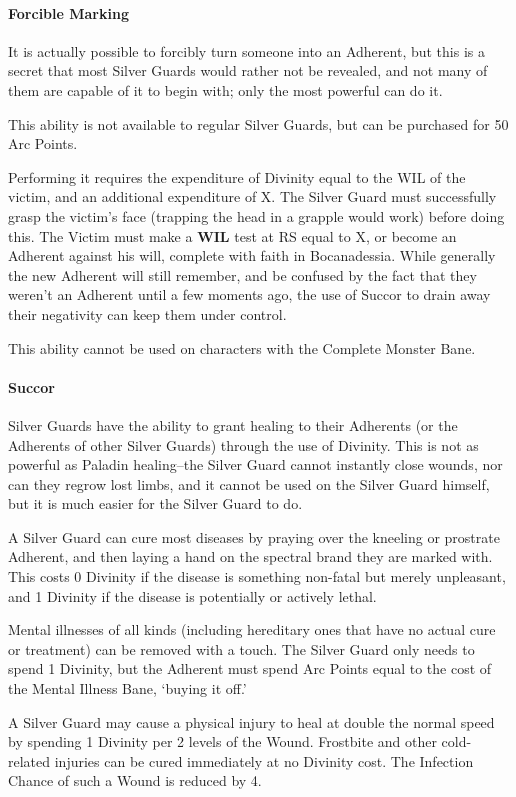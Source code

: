 \documentclass[oneside,11pt,english]{book}
\begin{document}
\paragraph{Forcible Marking}
It is actually possible to forcibly turn someone into an Adherent, but this is a secret that most 
Silver Guards would rather not be revealed, and not many of them are capable of it to begin with; 
only the most powerful can do it. 


This ability is not available to regular Silver Guards, but can be purchased for 50 Arc Points.


Performing it requires the expenditure of Divinity equal to the WIL of the victim, and an 
additional expenditure of X. The Silver Guard must successfully grasp the victim's face (trapping 
the head in a grapple would work) before doing this.
The Victim must make a \textbf{WIL} test at RS equal to X, or become an Adherent against his will, 
complete with faith in Bocanadessia. While generally the new Adherent will still remember, and 
be confused by the fact that they weren't an Adherent until a few moments ago, the use of Succor 
to drain away their negativity can keep them under control. 


This ability cannot be used on characters with the Complete Monster Bane. 
\paragraph{Succor}
Silver Guards have the ability to grant healing to their Adherents (or the Adherents of other Silver 
Guards) through the use of Divinity. This is not as powerful as Paladin healing--the Silver Guard 
cannot instantly close wounds, nor can they regrow lost limbs, and it cannot be used on the Silver 
Guard himself, but it is much easier for the Silver Guard to do. 


A Silver Guard can cure most diseases by praying over the kneeling or prostrate Adherent, and 
then laying a hand on the spectral brand they are marked with. This costs 0 Divinity if the disease 
is something non-fatal but merely unpleasant, and 1 Divinity if the disease is potentially or actively lethal. 


Mental illnesses of all kinds (including hereditary ones that have no actual cure or treatment) can 
be removed with a touch. The Silver Guard only needs to spend 1 Divinity, but the Adherent must 
spend Arc Points equal to the cost of the Mental Illness Bane, ‘buying it off.’ 


A Silver Guard may cause a physical injury to heal at double the normal speed by spending 1 
Divinity per 2 levels of the Wound. Frostbite and other cold-related injuries can be cured 
immediately at no Divinity cost. The Infection Chance of such a Wound is reduced by 4. 
\end{document}
